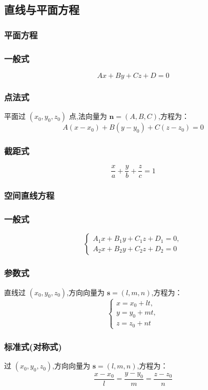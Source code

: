 \documentclass[UTF8]{ctexart}
\theoremstyle{remark}
\begin{document}
			
			\subsection{直线与平面方程}
			\subsubsection{平面方程}
			\subsubsection*{一般式}
			\[ Ax + By + Cz + D = 0 \]
			
			\subsubsection*{点法式}
			平面过 \((x_0, y_0, z_0)\) 点,法向量为 \(\boldsymbol{n} = (A, B, C)\),方程为：  
			\[ A(x - x_0) + B(y - y_0) + C(z - z_0) = 0 \]
			
			\subsubsection*{截距式}
			\[ \frac{x}{a} + \frac{y}{b} + \frac{z}{c} = 1 \]
			
			\subsubsection{空间直线方程}
			\subsubsection*{一般式}
			\[ \begin{cases} 
				A_1x + B_1y + C_1z + D_1 = 0, \\
				A_2x + B_2y + C_2z + D_2 = 0 
			\end{cases} \]
			
			\subsubsection*{参数式}
			直线过 \((x_0, y_0, z_0)\),方向向量为 \(\boldsymbol{s} = (l, m, n)\),方程为：  
			\[ \begin{cases} 
				x = x_0 + lt, \\ 
				y = y_0 + mt, \\ 
				z = z_0 + nt 
			\end{cases} \]
			
			\subsubsection*{标准式(对称式)}
			过 \((x_0, y_0, z_0)\),方向向量为 \(\boldsymbol{s} = (l, m, n)\),方程为：  
			\[ \frac{x - x_0}{l} = \frac{y - y_0}{m} = \frac{z - z_0}{n} \]
			
\end{document}
